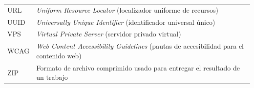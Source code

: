 \begin{longtable}{p{}p{}}
URL &
\emph{Uniform Resource Locator} (localizador uniforme de recursos)\\

UUID &
\emph{Universally Unique Identifier} (identificador universal único)\\

VPS &
\emph{Virtual Private Server} (servidor privado virtual)\\

WCAG &
\emph{Web Content Accessibility Guidelines} (pautas de accesibilidad para el contenido web)\\

ZIP &
Formato de archivo comprimido usado para entregar el resultado de un trabajo\\

\end{longtable}
\endgroup
